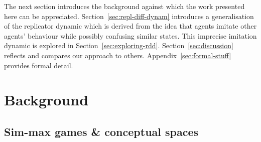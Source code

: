 \documentclass[12pt,english]{article}
\numberwithin{equation}{section}
\newcommand{\citepbjps}[1]{(\citeauthor{#1} [\citeyear{#1}])}
\begin{document}

The next section introduces the background against which the work presented here can be
appreciated. Section~\ref{sec:repl-diff-dynam} introduces a generalisation of the replicator
dynamic which is derived from the idea that agents imitate other agents' behaviour while
possibly confusing similar states. This imprecise imitation dynamic is explored in
Section~\ref{sec:exploring-rdd}. Section~\ref{sec:discussion} reflects and compares our
approach to others. Appendix~\ref{sec:formal-stuff} provides formal detail.

\section{Background}
\label{sec:background}


\subsection{Sim-max games \& conceptual spaces}
\end{document}
